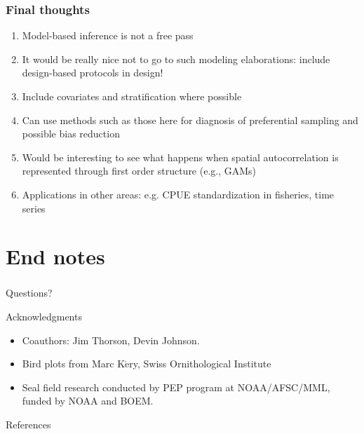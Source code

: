 \documentclass[serif,mathserif]{beamer}
\begin{document}
\begin{frame}
\frametitle{Final thoughts}
  \begin{enumerate}
    \item Model-based inference is not a free pass \pause
    \item It would be really nice not to go to such modeling elaborations: include design-based protocols in design! \pause
    \item Include covariates and stratification where possible \pause
    \item Can use methods such as those here for diagnosis of preferential sampling and possible bias reduction \pause
    \item Would be interesting to see what happens when spatial autocorrelation is represented through first order structure (e.g., GAMs) \pause
    \item Applications in other areas: e.g. CPUE standardization in fisheries, time series
  \end{enumerate}
\end{frame}

 \section{End notes}
  \begin{frame}
  \frametitle{}
  {\Huge Questions?}

  \vspace{0.5cm}

  \textcolor{noaaturq}{Acknowledgments} \\
  \begin{itemize}
  \item Coauthors: Jim Thorson, Devin Johnson.
  \item Bird plots from Marc K$\acute{\textrm{e}}$ry, Swiss Ornithological Institute
  \item Seal field research conducted by PEP program at NOAA/AFSC/MML, funded by NOAA and BOEM.
  \end{itemize}
  \vspace{0.5cm}
   \textcolor{noaaturq}{References}
 
 {\footnotesize
  }

 \end{frame}
\end{document}
